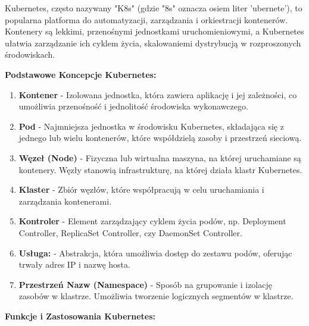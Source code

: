 \noindent Kubernetes, często nazywany "K8s" (gdzie "8s" oznacza osiem liter 'ubernete'), to popularna platforma do automatyzacji, zarządzania i orkiestracji kontenerów. Kontenery są lekkimi, przenośnymi jednostkami uruchomieniowymi, a Kubernetes ułatwia zarządzanie ich cyklem życia, skalowaniem\linebreak i dystrybucją w rozproszonych środowiskach.

\clearpage

{\bf Podstawowe Koncepcje Kubernetes:}

\begin{enumerate}
\item {\bf Kontener}
   - Izolowana jednostka, która zawiera aplikację i jej zależności, co umożliwia przenośność i jednolitość środowiska wykonawczego.

\item {\bf Pod}
   - Najmniejsza jednostka w środowisku Kubernetes, składająca się z jednego lub wielu kontenerów, które współdzielą zasoby i przestrzeń sieciową.

\item {\bf Węzeł (Node)}
   - Fizyczna lub wirtualna maszyna, na której uruchamiane są kontenery. Węzły stanowią infrastrukturę, na której działa klastr Kubernetes.

\item {\bf Klaster}
   - Zbiór węzłów, które współpracują w celu uruchamiania i zarządzania kontenerami.

\item {\bf Kontroler}
   - Element zarządzający cyklem życia podów, np. Deployment Controller, ReplicaSet Controller, czy DaemonSet Controller.

\item {\bf Usługa:}
   - Abstrakcja, która umożliwia dostęp do zestawu podów, oferując trwały adres IP i nazwę hosta.

\item {\bf Przestrzeń Nazw (Namespace)}
   - Sposób na grupowanie i izolację zasobów w klastrze. Umożliwia tworzenie logicznych segmentów w klastrze.
\end{enumerate}

{\bf Funkcje i Zastosowania Kubernetes:}

